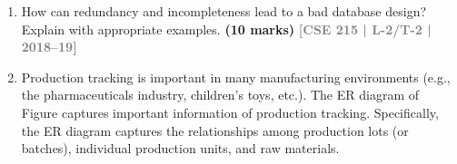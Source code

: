 \documentclass[12pt]{article}
\newcommand{\yr}[1]{\hfill\textcolor{gray}{\small\textbf{[#1]}}}
\newcommand{\mk}[1]{\textcolor{orange!70!black}{\small\textbf{(#1 marks)}}}
\begin{document}
\begin{enumerate}
\begin{center}
\end{center}
\mk{10} \yr{CSE 215 | L-2/T-2 | 2019--20}


\item How can redundancy and incompleteness lead to a bad database design? Explain with appropriate examples.
\mk{10} \yr{CSE 215 | L-2/T-2 | 2018--19}


\item Production tracking is important in many manufacturing environments (e.g., the pharmaceuticals
industry, children's toys, etc.). The ER diagram of Figure captures important
information of production tracking. Specifically, the ER diagram captures the relationships
among production lots (or batches), individual production units, and raw materials.


\end{enumerate}
\end{document}
